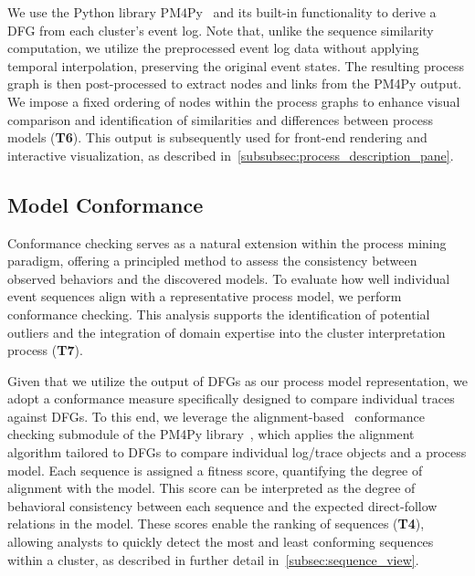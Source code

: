 \documentclass[preprint,journal]{vgtc}            %
\begin{document}
We use the Python library PM4Py~\cite{Alessandro19Process} and its built-in functionality to derive a DFG from each cluster’s event log.
Note that, unlike the sequence similarity computation, we utilize the preprocessed event log data without applying temporal interpolation, preserving the original event states.
The resulting process graph is then post-processed to extract nodes and links from the PM4Py output.
We impose a fixed ordering of nodes within the process graphs to enhance visual comparison and identification of similarities and differences between process models (\textbf{T6}).
This output is subsequently used for front-end rendering and interactive visualization, as described in~\cref{subsubsec:process_description_pane}.



\subsection{Model Conformance}

Conformance checking serves as a natural extension within the process mining paradigm, offering a principled method to assess the consistency between observed behaviors and the discovered models.
To evaluate how well individual event sequences align with a representative process model, we perform conformance checking.
This analysis supports the identification of potential outliers and the integration of domain expertise into the cluster interpretation process (\textbf{T7}).

Given that we utilize the output of DFGs as our process model representation, we adopt a conformance measure specifically designed to compare individual traces against DFGs.
To this end, we leverage the alignment-based~\cite{Adriansyah11Conformance} conformance checking submodule of the PM4Py library~\cite{Alessandro19Process}, which applies the alignment algorithm tailored to DFGs to compare individual log/trace objects and a process model.
Each sequence is assigned a fitness score, quantifying the degree of alignment with the model.
This score can be interpreted as the degree of behavioral consistency between each sequence and the expected direct-follow relations in the model.
These scores enable the ranking of sequences (\textbf{T4}), allowing analysts to quickly detect the most and least conforming sequences within a cluster, as described in further detail in~\cref{subsec:sequence_view}.
\end{document}
